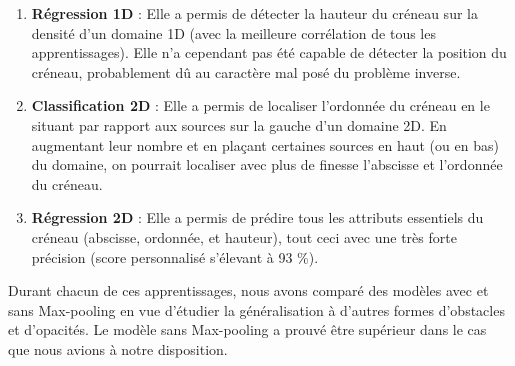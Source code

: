 \begin{enumerate}
  \item \textbf{Régression 1D} : Elle a permis de détecter la hauteur du créneau sur la densité d'un domaine 1D (avec la meilleure corrélation de tous les apprentissages). Elle n'a cependant pas été capable de détecter la position du créneau, probablement dû au caractère mal posé du problème inverse.
  \item \textbf{Classification 2D} : Elle a permis de localiser l'ordonnée du créneau en le situant par rapport aux sources sur la gauche d'un domaine 2D. En augmentant leur nombre et en plaçant certaines sources en haut (ou en bas) du domaine, on pourrait localiser avec plus de finesse l'abscisse et l'ordonnée du créneau.
  \item \textbf{Régression 2D} : Elle a permis de prédire tous les attributs essentiels du créneau (abscisse, ordonnée, et hauteur), tout ceci avec une très forte précision (score personnalisé s'élevant à 93 \%). 
\end{enumerate}

Durant chacun de ces apprentissages, nous avons comparé des modèles avec et sans Max-pooling en vue d'étudier la généralisation à d'autres formes d'obstacles et d'opacités. Le modèle sans Max-pooling a prouvé être supérieur dans le cas que nous avions à notre disposition.